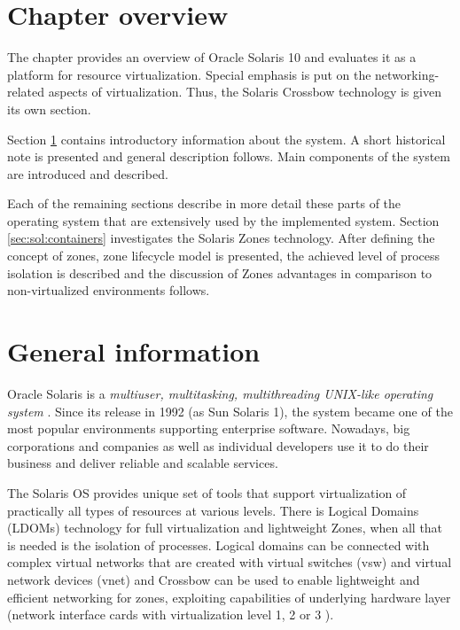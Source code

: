 \documentclass[11pt]{book}
\begin{document}
    \section*{Chapter overview}

      The chapter provides an overview of Oracle Solaris 10 and evaluates it as a platform for resource virtualization.
      Special emphasis is put on the networking-related aspects of virtualization. Thus, the Solaris Crossbow technology
      is given its own section.

      Section \ref{sec:sol:general} contains introductory information about the system. A short historical note is
      presented and general description follows. Main components of the system are introduced and described.
      
      Each of the remaining sections describe in more detail these parts of the operating system that are extensively
      used by the implemented system. Section \ref{sec:sol:containers} investigates the Solaris Zones technology. After
      defining the concept of zones, zone lifecycle model is presented, the achieved level of process isolation
      is described and the discussion of Zones advantages in comparison to non-virtualized environments follows.




    \section{General information}
    \label{sec:sol:general}

      Oracle Solaris is a \textit{multiuser, multitasking, multithreading UNIX-like operating system} \cite{reference}. Since its
      release in 1992 (as Sun Solaris 1), the system became one of the most popular environments supporting
      enterprise software. Nowadays, big corporations and companies as well as individual developers use it to do
      their business and deliver reliable and scalable services.

      The Solaris OS provides unique set of tools that support virtualization of practically all types of resources at
      various levels. There is Logical Domains (LDOMs) technology for full virtualization and lightweight Zones, when
      all that is needed is the isolation of processes. Logical domains can be connected with complex virtual networks
      that are created with virtual switches (vsw) and virtual network devices (vnet) \cite{ldomag} and Crossbow can be
      used to enable lightweight and efficient networking for zones, exploiting capabilities of underlying hardware
      layer (network interface cards with virtualization level 1, 2 or 3 \cite{santos}).
\end{document}
